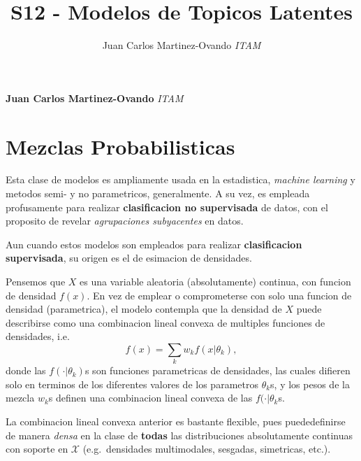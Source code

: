 \documentclass[11pt,]{article}
\title{S12 - Modelos de Topicos Latentes  }
\author{\Large Juan Carlos Martinez-Ovando\vspace{0.05in} \newline\normalsize\emph{ITAM}  }
\date{}
\newcommand*{\authorfont}{\fontfamily{phv}\selectfont}
\begin{document}
	
%

{%
\setlength{\parindent}{0pt}
\thispagestyle{plain}
{\fontsize{18}{20}\selectfont\raggedright 
\maketitle  %

}

{
   \vskip 13.5pt\relax \normalsize\fontsize{11}{12} 
\textbf{\authorfont Juan Carlos Martinez-Ovando} \hskip 15pt \emph{\small ITAM}   

}

}






\vskip 6.5pt


\noindent  \section{Mezclas Probabilisticas}\label{mezclas-probabilisticas}

Esta clase de modelos es ampliamente usada en la estadistica,
\emph{machine learning} y metodos semi- y no parametricos, generalmente.
A su vez, es empleada profusamente para realizar \textbf{clasificacion
no supervisada} de datos, con el proposito de revelar \emph{agrupaciones
subyacentes} en datos.

Aun cuando estos modelos son empleados para realizar
\textbf{clasificacion supervisada}, su origen es el de esimacion de
densidades.

Pensemos que \(X\) es una variable aleatoria (absolutamente) continua,
con funcion de densidad \(f(x)\). En vez de emplear o comprometerse con
solo una funcion de densidad (parametrica), el modelo contempla que la
densidad de \(X\) puede describirse como una combinacion lineal convexa
de multiples funciones de densidades, i.e. \[
f(x)=\sum_k w_k f(x|\theta_k),
\] donde las \(f(\cdot|\theta_k)\)s son funciones parametricas de
densidades, las cuales difieren solo en terminos de los diferentes
valores de los parametros \(\theta_k\)s, y los pesos de la mezcla
\(w_k\)s definen una combinacion lineal convexa de las
\(f(\cdot|\theta_k\)s.

La combinacion lineal convexa anterior es bastante flexible, pues
puededefinirse de manera \emph{densa} en la clase de \textbf{todas} las
distribuciones absolutamente continuas con soporte en \(\mathcal{X}\)
(e.g.~densidades multimodales, sesgadas, simetricas, etc.).
\end{document}
